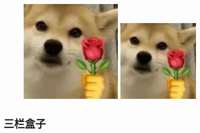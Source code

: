 \documentclass[normalsize]{article}   %
\begin{document}
		\begin{figure}[htbp!]
			\begin{minipage}{0.48\linewidth}
				\centering    %
				\includegraphics[height=5cm]{img/sample.png}
			\end{minipage}
			\begin{minipage}{0.48\linewidth}
				\centering
				\includegraphics[height=4cm]{img/sample.png}
			\end{minipage}
		\end{figure}
	
		\subsection{三栏盒子}
		
\end{document}
